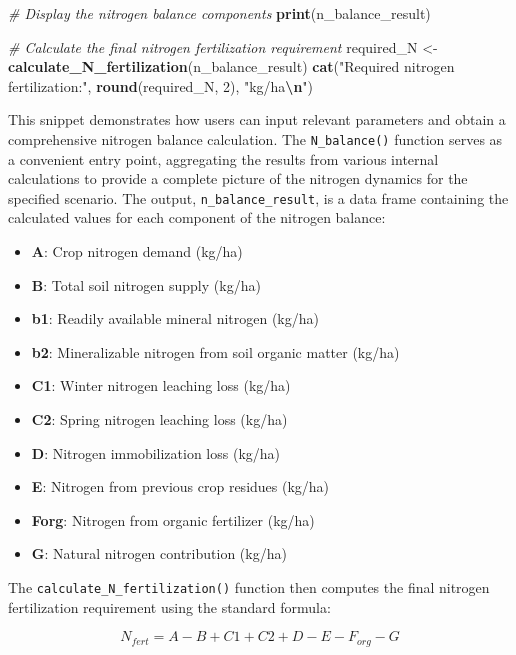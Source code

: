 \documentclass[
  11pt,
]{article}
\newenvironment{Shaded}{\begin{snugshade}}{\end{snugshade}}
\newcommand{\CommentTok}[1]{\textcolor[rgb]{0.56,0.35,0.01}{\textit{#1}}}
\newcommand{\DecValTok}[1]{\textcolor[rgb]{0.00,0.00,0.81}{#1}}
\newcommand{\FunctionTok}[1]{\textcolor[rgb]{0.13,0.29,0.53}{\textbf{#1}}}
\newcommand{\NormalTok}[1]{#1}
\newcommand{\OtherTok}[1]{\textcolor[rgb]{0.56,0.35,0.01}{#1}}
\newcommand{\SpecialCharTok}[1]{\textcolor[rgb]{0.81,0.36,0.00}{\textbf{#1}}}
\newcommand{\StringTok}[1]{\textcolor[rgb]{0.31,0.60,0.02}{#1}}
\providecommand{\tightlist}{%
  \setlength{\itemsep}{0pt}\setlength{\parskip}{0pt}}
\begin{document}
\begin{Shaded}
\begin{Highlighting}[]
\CommentTok{\# Display the nitrogen balance components}
\FunctionTok{print}\NormalTok{(n\_balance\_result)}

\CommentTok{\# Calculate the final nitrogen fertilization requirement}
\NormalTok{required\_N }\OtherTok{\textless{}{-}} \FunctionTok{calculate\_N\_fertilization}\NormalTok{(n\_balance\_result)}
\FunctionTok{cat}\NormalTok{(}\StringTok{"Required nitrogen fertilization:"}\NormalTok{, }\FunctionTok{round}\NormalTok{(required\_N, }\DecValTok{2}\NormalTok{), }\StringTok{"kg/ha}\SpecialCharTok{\textbackslash{}n}\StringTok{"}\NormalTok{)}
\end{Highlighting}
\end{Shaded}

This snippet demonstrates how users can input relevant parameters and
obtain a comprehensive nitrogen balance calculation. The
\texttt{N\_balance()} function serves as a convenient entry point,
aggregating the results from various internal calculations to provide a
complete picture of the nitrogen dynamics for the specified scenario.
The output, \texttt{n\_balance\_result}, is a data frame containing the
calculated values for each component of the nitrogen balance:

\begin{itemize}
\tightlist
\item
  \textbf{A}: Crop nitrogen demand (kg/ha)
\item
  \textbf{B}: Total soil nitrogen supply (kg/ha)
\item
  \textbf{b1}: Readily available mineral nitrogen (kg/ha)
\item
  \textbf{b2}: Mineralizable nitrogen from soil organic matter (kg/ha)
\item
  \textbf{C1}: Winter nitrogen leaching loss (kg/ha)
\item
  \textbf{C2}: Spring nitrogen leaching loss (kg/ha)
\item
  \textbf{D}: Nitrogen immobilization loss (kg/ha)
\item
  \textbf{E}: Nitrogen from previous crop residues (kg/ha)
\item
  \textbf{Forg}: Nitrogen from organic fertilizer (kg/ha)
\item
  \textbf{G}: Natural nitrogen contribution (kg/ha)
\end{itemize}

The \texttt{calculate\_N\_fertilization()} function then computes the
final nitrogen fertilization requirement using the standard formula:

\[N_{fert} = A - B + C1 + C2 + D - E - F_{org} - G\]
\end{document}
